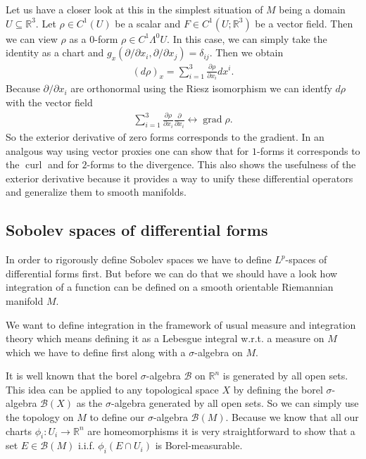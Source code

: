 \documentclass[12pt,a4paper]{article}
\numberwithin{equation}{subsection}
\numberwithin{lemma}{subsection}
\theoremstyle{definition}
\DeclareMathOperator{\curl}{curl}
\DeclareMathOperator{\grad}{grad}
\newcommand{\real}{\mathbb{R}}
\begin{document}
Let us have a closer look at this in the simplest situation of $M$ being a 
domain $U \subseteq \real^3$. Let $\rho \in C^1(U)$ be a scalar
and $F \in C^1(U;\real^3)$ be a vector field. Then we can view 
$\rho$ as a $0$-form $\rho \in C^1\Lambda^0 U$. 
In this case, we can simply take the identity as a chart 
and $g_x(\partial / \partial x_i, \partial / \partial x_j) = \delta_{ij}$.
Then we obtain 
\begin{align*}
    (d\rho)_x = \sum\limits_{i=1}^3 \frac{\partial \rho}{\partial x_i} dx^i. 
\end{align*}
Because $\partial / \partial x_i$ are orthonormal using the Riesz isomorphism
we can identfy $d\rho$ with the vector field
\begin{align*}
    \sum\limits_{i=1}^3 \frac{\partial \rho}{\partial x_i} 
    \frac{\partial }{\partial x_i} 
    \leftrightarrow \grad \rho.
\end{align*}
So the exterior derivative of zero forms corresponds to the gradient.
In an analgous way using vector proxies one can show that for 
$1$-forms it corresponds to the $\curl$ and for $2$-forms to the divergence.
This also shows the usefulness of the exterior derivative because it 
provides a way to unify these differential operators
and generalize them 
to smooth manifolds.


\subsection{Sobolev spaces of differential forms}

In order to rigorously define Sobolev spaces we have to define $L^p$-spaces 
of differential forms first. But before we can do that we should have a look
how integration of a function can be defined on a smooth orientable 
Riemannian manifold $M$. 

We want to define integration in the framework of usual measure and integration
theory which means defining it as a Lebesgue integral w.r.t. a measure on $M$
which we have to define first along with a $\sigma$-algebra on $M$. 

It is well known that
the borel $\sigma$-algebra $\mathcal{B}$ on $\real^n$ is generated
by all open sets. This idea can be applied to any topological space $X$ by 
defining the borel $\sigma$-algebra $\mathcal{B}(X)$ as the $\sigma$-algebra 
generated by all open sets. So we can simply use the topology on $M$ to define 
our $\sigma$-algebra $\mathcal{B}(M)$. Because we know that all our 
charts $\phi_i: U_i \rightarrow \real^n$ are homeomorphisms it is very 
straightforward to show that a set $E \in \mathcal{B}(M)$ i.i.f.
$\phi_i(E \cap U_i)$ is Borel-measurable. 
\end{document}
